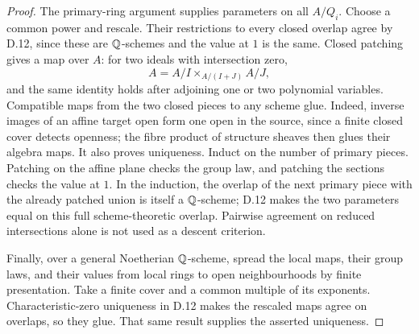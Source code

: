 \begin{proof}
The primary-ring argument supplies parameters on all
$A/Q_i$. Choose a common power and rescale. Their restrictions
to every closed overlap agree by D.12, since these are
$\mathbb Q$-schemes and the value at $1$ is the same.
Closed patching gives a map over $A$: for two ideals with
intersection zero,
\[
                 A=A/I\times_{A/(I+J)}A/J,
\]
and the same identity holds after adjoining one or two
polynomial variables. Compatible maps from the two closed
pieces to any scheme glue. Indeed, inverse images of an affine
target open form one open in the source, since a finite closed
cover detects openness; the fibre product of structure sheaves
then glues their algebra maps. It also proves uniqueness.
Induct on the number of primary pieces. Patching on the affine
plane checks the group law, and patching the sections checks
the value at $1$. In the induction, the overlap of the next
primary piece with the already patched union is itself a
$\mathbb Q$-scheme; D.12 makes the two parameters equal on this full
scheme-theoretic overlap. Pairwise agreement on reduced
intersections alone is not used as a descent criterion.

Finally, over a general Noetherian $\mathbb Q$-scheme, spread the local
maps, their group laws, and their values from local rings to
open neighbourhoods by finite presentation. Take a finite
cover and a common multiple of its exponents. Characteristic-zero
uniqueness in D.12 makes the rescaled maps agree on overlaps,
so they glue. That same result supplies the asserted uniqueness.
\end{proof}

